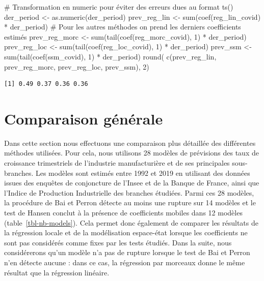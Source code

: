 \documentclass[
  a4paper,
  DIV=11,
  numbers=noendperiod,
  french]{scrartcl}
\newenvironment{Shaded}{\begin{snugshade}}{\end{snugshade}}
\newcommand{\CommentTok}[1]{\textcolor[rgb]{0.37,0.37,0.37}{#1}}
\newcommand{\DecValTok}[1]{\textcolor[rgb]{0.68,0.00,0.00}{#1}}
\newcommand{\FunctionTok}[1]{\textcolor[rgb]{0.28,0.35,0.67}{#1}}
\newcommand{\NormalTok}[1]{\textcolor[rgb]{0.00,0.23,0.31}{#1}}
\newcommand{\OtherTok}[1]{\textcolor[rgb]{0.00,0.23,0.31}{#1}}
\newcommand{\SpecialCharTok}[1]{\textcolor[rgb]{0.37,0.37,0.37}{#1}}
\newcommand\1{{\mathds 1}}
\theoremstyle{remark}
\begin{document}
\begin{Shaded}
\begin{Highlighting}[]
\CommentTok{\# Transformation en numeric pour éviter des erreurs dues au format ts()}
\NormalTok{der\_period }\OtherTok{\textless{}{-}} \FunctionTok{as.numeric}\NormalTok{(der\_period)}
\NormalTok{prev\_reg\_lin }\OtherTok{\textless{}{-}} \FunctionTok{sum}\NormalTok{(}\FunctionTok{coef}\NormalTok{(reg\_lin\_covid) }\SpecialCharTok{*}\NormalTok{ der\_period)}
\CommentTok{\# Pour les autres méthodes on prend les derniers coefficients estimés}
\NormalTok{prev\_reg\_morc }\OtherTok{\textless{}{-}} \FunctionTok{sum}\NormalTok{(}\FunctionTok{tail}\NormalTok{(}\FunctionTok{coef}\NormalTok{(reg\_morc\_covid), }\DecValTok{1}\NormalTok{) }\SpecialCharTok{*}\NormalTok{ der\_period)}
\NormalTok{prev\_reg\_loc }\OtherTok{\textless{}{-}} \FunctionTok{sum}\NormalTok{(}\FunctionTok{tail}\NormalTok{(}\FunctionTok{coef}\NormalTok{(reg\_loc\_covid), }\DecValTok{1}\NormalTok{) }\SpecialCharTok{*}\NormalTok{ der\_period)}
\NormalTok{prev\_ssm }\OtherTok{\textless{}{-}} \FunctionTok{sum}\NormalTok{(}\FunctionTok{tail}\NormalTok{(}\FunctionTok{coef}\NormalTok{(ssm\_covid), }\DecValTok{1}\NormalTok{) }\SpecialCharTok{*}\NormalTok{ der\_period)}
\FunctionTok{round}\NormalTok{(}
  \FunctionTok{c}\NormalTok{(prev\_reg\_lin, prev\_reg\_morc, prev\_reg\_loc, prev\_ssm), }
  \DecValTok{2}\NormalTok{)}
\end{Highlighting}
\end{Shaded}

\begin{verbatim}
[1] 0.49 0.37 0.36 0.36
\end{verbatim}

\section{Comparaison générale}\label{sec-comp-generales}

Dans cette section nous effectuons une comparaison plus détaillée des
différentes méthodes utilisées. Pour cela, nous utilisons 28 modèles de
prévisions des taux de croissance trimestriels de l'industrie
manufacturière et de ses principales sous-branches. Les modèles sont
estimés entre 1992 et 2019 en utilisant des données issues des enquêtes
de conjoncture de l'Insee et de la Banque de France, ainsi que l'Indice
de Production Industrielle des branches étudiées. Parmi ces 28 modèles,
la procédure de Bai et Perron détecte au moins une rupture sur 14
modèles et le test de Hansen conclut à la présence de coefficients
mobiles dans 12 modèles (table~\ref{tbl-nb-models}). Cela permet donc
également de comparer les résultats de la régression locale et de la
modélisation espace-état lorsque les coefficients ne sont pas considérés
comme fixes par les tests étudiés. Dans la suite, nous considérerons
qu'un modèle n'a pas de rupture lorsque le test de Bai et Perron n'en
détecte aucune : dans ce cas, la régression par morceaux donne le même
résultat que la régression linéaire.
\end{document}
